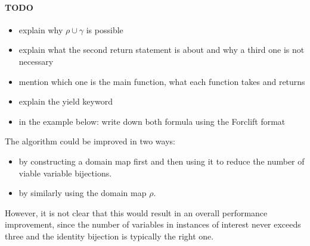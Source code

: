 \documentclass{article}
\theoremstyle{definition}
\begin{document}
\paragraph{TODO}
\begin{itemize}
\item explain why $\rho \cup \gamma$ is possible
\item explain what the second return statement is about and why a third one is not necessary
\item mention which one is the main function, what each function takes and returns
\item explain the yield keyword
\item in the example below: write down both formula using the Forclift format
\end{itemize}

The algorithm could be improved in two ways:
\begin{itemize}
\item by constructing a domain map first and then using it to reduce the number of viable variable bijections.
\item by similarly using the domain map $\rho$.
\end{itemize}
However, it is not clear that this would result in an overall performance improvement, since the number of variables in instances of interest never exceeds three and the identity bijection is typically the right one.
\end{document}
